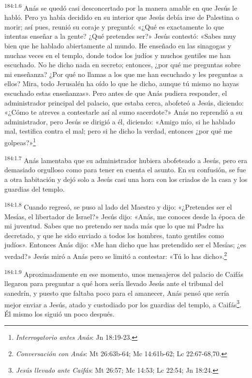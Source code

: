 \par
\textsuperscript{184:1.6} Anás se quedó casi desconcertado por la manera amable en que Jesús le habló. Pero ya había decidido en su interior que Jesús debía irse de Palestina o morir; así pues, reunió su coraje y preguntó: «¿Qué es exactamente lo que intentas enseñar a la gente? ¿Qué pretendes ser?» Jesús contestó: «Sabes muy bien que he hablado abiertamente al mundo. He enseñado en las sinagogas y muchas veces en el templo, donde todos los judíos y muchos gentiles me han escuchado. No he dicho nada en secreto; entonces, ¿por qué me preguntas sobre mi enseñanza? ¿Por qué no llamas a los que me han escuchado y les preguntas a ellos? Mira, todo Jerusalén ha oído lo que he dicho, aunque tú mismo no hayas escuchado estas enseñanzas». Pero antes de que Anás pudiera responder, el administrador principal del palacio, que estaba cerca, abofeteó a Jesús, diciendo: «¿Cómo te atreves a contestarle así al sumo sacerdote?» Anás no reprendió a su administrador, pero Jesús se dirigió a él, diciendo: «Amigo mío, si he hablado mal, testifica contra el mal; pero si he dicho la verdad, entonces ¿por qué me golpeas?»\footnote{\textit{Interrogatorio antes Anás}: Jn 18:19-23.}

\par
\textsuperscript{184:1.7} Anás lamentaba que su administrador hubiera abofeteado a Jesús, pero era demasiado orgulloso como para tener en cuenta el asunto. En su confusión, se fue a otra habitación y dejó solo a Jesús casi una hora con los criados de la casa y los guardias del templo.

\par
\textsuperscript{184:1.8} Cuando regresó, se puso al lado del Maestro y dijo: «¿Pretendes ser el Mesías, el libertador de Israel?» Jesús dijo: «Anás, me conoces desde la época de mi juventud. Sabes que no pretendo ser nada más que lo que mi Padre ha decretado, y que he sido enviado a todos los hombres, tanto gentiles como judíos». Entonces Anás dijo: «Me han dicho que has pretendido ser el Mesías; ¿es verdad?» Jesús miró a Anás pero se limitó a contestar: «Tú lo has dicho».\footnote{\textit{Conversación con Anás}: Mt 26:63b-64; Mc 14:61b-62; Lc 22:67-68,70.}

\par
\textsuperscript{184:1.9} Aproximadamente en ese momento, unos mensajeros del palacio de Caifás llegaron para preguntar a qué hora sería llevado Jesús ante el tribunal del sanedrín, y puesto que faltaba poco para el amanecer, Anás pensó que sería mejor enviar a Jesús, atado y custodiado por los guardias del templo, a Caifás\footnote{\textit{Jesús llevado ante Caifás}: Mt 26:57; Mc 14:53; Lc 22:54; Jn 18:24.}. Él mismo los siguió un poco después.

